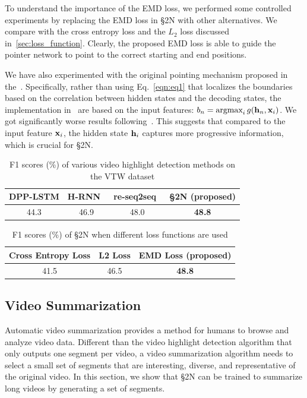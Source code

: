 \documentclass[10pt,journal,compsoc]{IEEEtran}
\begin{document}
 To understand the importance of the EMD loss, we performed some controlled experiments by replacing the EMD loss in \S2N with other alternatives. We compare with the cross entropy loss and the $L_2$ loss discussed in~\ref{sec:loss_function}.  Clearly, the proposed EMD loss is able to guide the pointer network to point to the correct starting and end positions.

We have also experimented with the original pointing mechanism proposed in the~\cite{vinyals2015pointer}. Specifically, rather than using Eq.~\ref{eqn:eq1} that localizes the boundaries based on the correlation between hidden states and the decoding states, the implementation in~\cite{vinyals2015pointer} are based on the input features: $b_n =  \mathop{\textrm{argmax}}_{i} g({\bf h}_n, {\bf x}_i)$. We got significantly worse results following~\cite{vinyals2015pointer}. This suggests that compared to the input feature ${\bf x}_i$, the hidden state ${\bf h}_i$ captures more progressive information, which is crucial for \S2N.
 

\begin{table}
\caption{F1 scores (\%) of various video highlight detection methods on the VTW dataset\label{tab:highlight}}
 \centering
 \begin{tabular}{cccc}
 \toprule
 DPP-LSTM \cite{zhang2016video} & H-RNN~\cite{zhao2017hierarchical} & re-seq2seq~\cite{zhang2018retrospective} & \S2N (proposed)  \\
 \midrule
44.3 & 46.9 & 48.0 & \textbf{48.8} \\
 \bottomrule
 \end{tabular}
 \end{table}


\begin{table}
\caption{ F1 scores (\%) of \S2N when different loss functions are used\label{tab:highlight}}
 \centering
 \begin{tabular}{ccc}
 \toprule
 Cross Entropy Loss & L2 Loss & EMD Loss (proposed)  \\
 \midrule
41.5 & 46.5 & \textbf{48.8} \\
  \bottomrule
 \end{tabular}
 \end{table}


\subsection{Video Summarization}
Automatic video summarization provides a method for humans to browse and analyze video data. Different than the video highlight detection algorithm that only outputs one segment per video,  a video summarization algorithm needs to select a small set of segments that are interesting, diverse, and representative of the original video. In this section, we show that \S2N can be trained to summarize long videos by generating a set of segments. 
\end{document}
